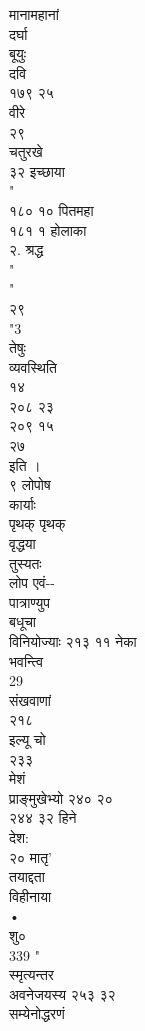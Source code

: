 \documentclass[11pt, openany]{book}
\begin{document}
{{{{{{{{{{{{{{{{{{{{{{{{{{{{{{{{{{{{{{{{{{{{{{{{{{{{{{{{{{{{{{{{{{{{{{{{{{{{{{{{{{{{{{{{{{{{{{{{{{{{{{{{{{{{{मानामहानां\\
दर्घा\\
बूयुः\\
दवि\\
१७९ २५\\
वीरे\\
२९\\
चतुरखे\\
३२ इच्छाया\\
"\\
१८० १० पितमहा\\
१८१ १ होलाका\\
२. श्रद्ध\\
"\\
"\\
२९\\
"3\\
तेषुः\\
व्यवस्थिति\\
१४\\
२०८ २३\\
२०९ १५\\
२७\\
}{इति}{ ।\\
९ लोपोष\\
कार्याः\\
पृथक् पृथक्\\
वृद्धया\\
तुस्यतः\\
लोप एवं-\/-\\
पात्राण्युप\\
बधूचा\\
विनियोज्याः २१३ ११ नेका\\
भवन्त्वि\\
29\\
संखवाणां\\
२१८\\
इल्यू चो\\
२३३\\
मेशं\\
प्राङ्मुखेभ्यो २४० २०\\
२४४ ३२ हिने\\
देश:\\
२० मातृ'\\
तयाद्दता\\
विहीनाया\\
•\\
शु०\\
339 "\\
स्मृत्यन्तर\\
अवनेजयस्य २५३ ३२\\
सम्येनोद्धरणं\\
}}}}}}}}}}}}}}}}}}}}}}}}}}}}}}}}}}}}}}}}}}}}}}}}}}}}}}}}}}}}}}}}}}}}}}}}}}}}}}}}}}}}}}}}}}}}}}}}}}}}}}}}}}}}}
\end{document}
